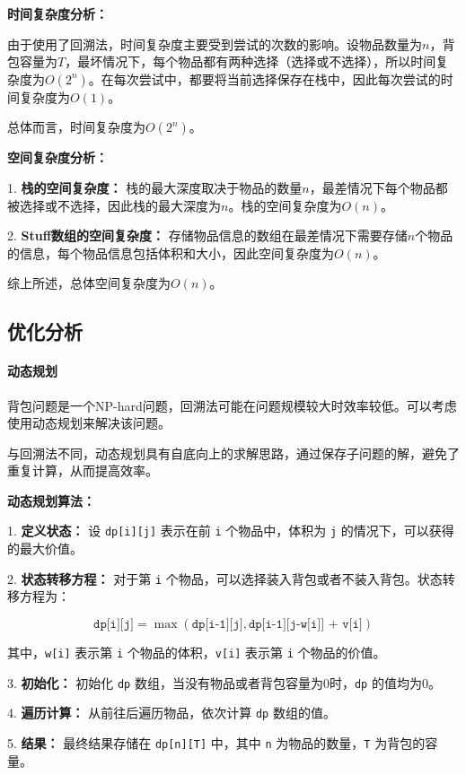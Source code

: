 \documentclass[UTF8]{ctexart}
\begin{document}
\textbf{时间复杂度分析：}

由于使用了回溯法，时间复杂度主要受到尝试的次数的影响。设物品数量为$n$，背包容量为$T$，最坏情况下，每个物品都有两种选择（选择或不选择），所以时间复杂度为$O(2^n)$。在每次尝试中，都要将当前选择保存在栈中，因此每次尝试的时间复杂度为$O(1)$。

总体而言，时间复杂度为$O(2^n)$。

\textbf{空间复杂度分析：}

1. \textbf{栈的空间复杂度：} 栈的最大深度取决于物品的数量$n$，最差情况下每个物品都被选择或不选择，因此栈的最大深度为$n$。栈的空间复杂度为$O(n)$。

2. \textbf{Stuff数组的空间复杂度：} 存储物品信息的数组在最差情况下需要存储$n$个物品的信息，每个物品信息包括体积和大小，因此空间复杂度为$O(n)$。

综上所述，总体空间复杂度为$O(n)$。




\subsection*{优化分析}

\paragraph*{动态规划}
背包问题是一个NP-hard问题，回溯法可能在问题规模较大时效率较低。可以考虑使用动态规划来解决该问题。

与回溯法不同，动态规划具有自底向上的求解思路，通过保存子问题的解，避免了重复计算，从而提高效率。

\textbf{动态规划算法：}

1. \textbf{定义状态：} 设 \texttt{dp[i][j]} 表示在前 \texttt{i} 个物品中，体积为 \texttt{j} 的情况下，可以获得的最大价值。

2. \textbf{状态转移方程：} 对于第 \texttt{i} 个物品，可以选择装入背包或者不装入背包。状态转移方程为：

   \[
   \texttt{dp[i][j]} = \max(\texttt{dp[i-1][j]}, \texttt{dp[i-1][j-w[i]] + v[i]})
   \]

   其中，\texttt{w[i]} 表示第 \texttt{i} 个物品的体积，\texttt{v[i]} 表示第 \texttt{i} 个物品的价值。

3. \textbf{初始化：} 初始化 \texttt{dp} 数组，当没有物品或者背包容量为0时，\texttt{dp} 的值均为0。

4. \textbf{遍历计算：} 从前往后遍历物品，依次计算 \texttt{dp} 数组的值。

5. \textbf{结果：} 最终结果存储在 \texttt{dp[n][T]} 中，其中 \texttt{n} 为物品的数量，\texttt{T} 为背包的容量。
\end{document}
